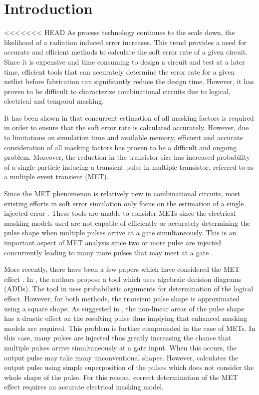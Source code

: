 \documentclass[conference]{IEEEtran}
\begin{document}
\section{Introduction} 

<<<<<<< HEAD
As process technology continues to the scale down, the likelihood of a radiation induced error increases. This trend provides a need for accurate and efficient methods to calculate the soft error rate of a given circuit. Since it is expensive and time consuming to design a circuit and test at a later time, efficient tools that can accurately determine the error rate for a given netlist before fabrication can significantly reduce the design time. However, it has proven to be difficult to characterize combinational circuits due to logical, electrical and temporal masking.

It has been shown in \cite{MARS_C,METSys} that concurrent estimation of all masking factors is required in order to ensure that the soft error rate is calculated accurately. However, due to limitations on simulation time and available memory, efficient and accurate consideration of all masking factors has proven to be a difficult and ongoing problem. Moreover, the reduction in the transistor size has increased probability of a single particle inducing a transient pulse in multiple transistor, referred to as a multiple event transient (MET).

Since the MET phenomenon is relatively new in combinational circuits, most existing efforts in soft error simulation only focus on the estimation of a single injected error \cite{Accurate_Masking,SERA,FASER,MARS_C}. These tools are unable to consider METs since the electrical masking models used are not capable of efficiently or accurately determining the pulse shape when multiple pulses arrive at a gate simultaneously. This is an important aspect of MET analysis since two or more pulse are injected concurrently leading to many more pulses that may meet at a gate . 

More recently, there have been a few papers which have considered the MET effect \cite{METSys,Fazeli2011}. In \cite{METSys}, the authors propose a tool which uses algebraic decision diagrams (ADDs). The tool in \cite{Fazeli2011} uses probabilistic arguments for determination of the logical effect. However, for both methods, the transient pulse shape is approximated using a square shape. As suggested in \cite{Accurate_Masking,Watkins2016}, the non-linear areas of the pulse shape has a drastic effect on the resulting pulse thus implying that enhanced masking models are required. This problem is further compounded in the case of METs. In this case, many pulses are injected thus greatly increasing the chance that multiple pulses arrive simultaneously at a gate input. When this occurs, the output pulse may take many unconventional shapes. However, \cite{Accurate_Masking,Watkins2016} calculates the output pulse using simple superposition of the pulses which does not consider the whole shape of the pulse. For this reason, correct determination of the MET effect requires an accurate electrical masking model.
\end{document}
